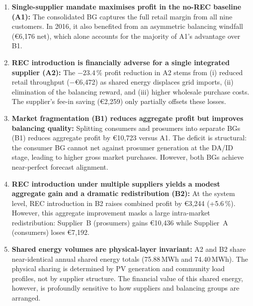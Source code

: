 \begin{enumerate}
    \item \textbf{Single-supplier mandate maximises profit in the no-REC
          baseline (A1):}  The consolidated BG captures the full retail margin
          from all nine customers.  In 2016, it also benefited from an
          asymmetric balancing windfall (€6{,}176 net), which alone accounts for
          the majority of A1's advantage over B1.

    \item \textbf{REC introduction is financially adverse for a single
          integrated supplier (A2):}  The $-23.4$\,\% profit reduction in A2
          stems from (i) reduced retail throughput ($-$€6{,}472) as shared energy
          displaces grid imports, (ii) elimination of the balancing reward, and
          (iii) higher wholesale purchase costs.  The supplier's fee-in saving
          (€2{,}259) only partially offsets these losses.

    \item \textbf{Market fragmentation (B1) reduces aggregate profit but
          improves balancing quality:}  Splitting consumers and prosumers into
          separate BGs (B1) reduces aggregate profit by €10{,}723 versus A1.
          The deficit is structural: the consumer BG cannot net against prosumer
          generation at the DA/ID stage, leading to higher gross market purchases.
          However, both BGs achieve near-perfect forecast alignment.

    \item \textbf{REC introduction under multiple suppliers yields a modest
          aggregate gain and a dramatic redistribution (B2):}  At the system
          level, REC introduction in B2 raises combined profit by €3{,}244
          (+5.6\,\%).  However, this aggregate improvement masks a large
          intra-market redistribution: Supplier~B (prosumers) gains €10{,}436
          while Supplier~A (consumers) loses €7{,}192.

    \item \textbf{Shared energy volumes are physical-layer invariant:}
          A2 and B2 share near-identical annual shared energy totals
          (75.88\,MWh and 74.40\,MWh).  The physical sharing is determined
          by PV generation and community load profiles, not by supplier structure.
          The financial value of this shared energy, however, is profoundly
          sensitive to how suppliers and balancing groups are arranged.


\end{enumerate}
